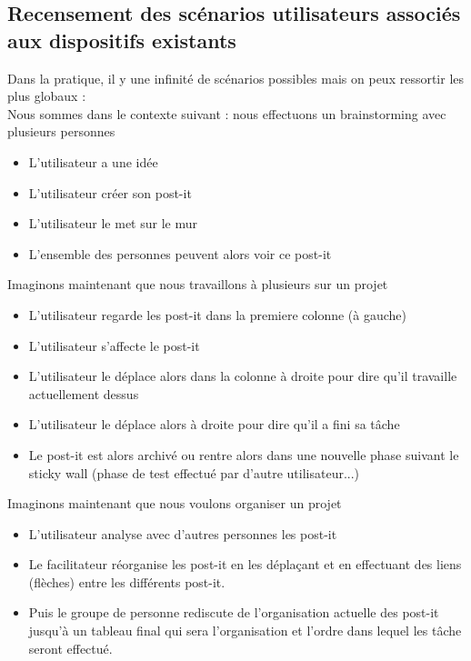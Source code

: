 \documentclass{article}
\begin{document}
\subsection{Recensement des scénarios utilisateurs associés aux dispositifs existants}
\hspace*{0.6cm}Dans la pratique, il y une infinité de scénarios possibles mais on peux ressortir les plus globaux :
\vspace{0.2cm}\\
Nous sommes dans le contexte suivant : nous effectuons un brainstorming avec plusieurs personnes
\begin{itemize}
  \item L'utilisateur a une idée
  \item L'utilisateur créer son post-it
  \item L'utilisateur le met sur le mur
  \item L'ensemble des personnes peuvent alors voir ce post-it
\end{itemize}
\vspace{0.2cm}
Imaginons maintenant que nous travaillons à plusieurs sur un projet
\begin{itemize}
  \item L'utilisateur regarde les post-it dans la premiere colonne (à gauche)
  \item L'utilisateur s'affecte le post-it
  \item L'utilisateur le déplace alors dans la colonne à droite pour dire qu'il travaille actuellement dessus
  \item L'utilisateur le déplace alors à droite pour dire qu'il a fini sa tâche
  \item Le post-it est alors archivé ou rentre alors dans une nouvelle phase suivant le sticky wall (phase de test effectué par d'autre utilisateur...)
\end{itemize}
\vspace{0.2cm}
Imaginons maintenant que nous voulons organiser un projet
\begin{itemize}
  \item L'utilisateur analyse avec d'autres personnes les post-it
  \item Le facilitateur réorganise les post-it en les déplaçant et en effectuant des liens (flèches) entre les différents post-it.
  \item Puis le groupe de personne rediscute de l'organisation actuelle des post-it jusqu'à un tableau final qui sera l'organisation et l'ordre dans lequel les tâche seront effectué.
\end{itemize}
\end{document}

